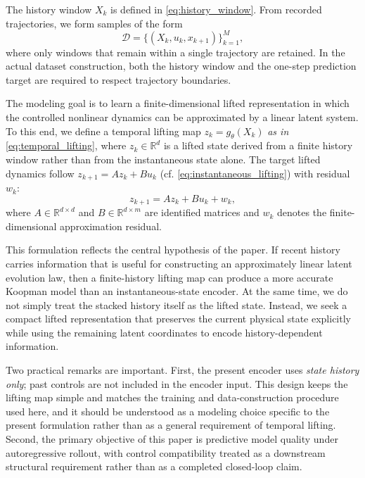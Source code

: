\documentclass[journal]{IEEEtran}
\begin{document}
The history window $X_k$ is defined in \eqref{eq:history_window}. From recorded trajectories, we form samples of the form
\begin{equation}
    \mathcal{D} = \{(X_k,u_k,x_{k+1})\}_{k=1}^{M},
    \label{eq:dataset}
\end{equation}
where only windows that remain within a single trajectory are retained. In the actual dataset construction, both the history window and the one-step prediction target are required to respect trajectory boundaries.

The modeling goal is to learn a finite-dimensional lifted representation in which the controlled nonlinear dynamics can be approximated by a linear latent system. To this end, we define a temporal lifting map $z_k = g_\theta(X_k)$ \emph{as in} \eqref{eq:temporal_lifting}, where $z_k \in \mathbb{R}^d$ is a lifted state derived from a finite history window rather than from the instantaneous state alone. The target lifted dynamics follow $z_{k+1}=Az_k+Bu_k$ (cf. \eqref{eq:instantaneous_lifting}) with residual $w_k$:
\begin{equation}
    z_{k+1} = A z_k + B u_k + w_k,
    \label{eq:lifted_dynamics}
\end{equation}
where $A \in \mathbb{R}^{d\times d}$ and $B \in \mathbb{R}^{d\times m}$ are identified matrices and $w_k$ denotes the finite-dimensional approximation residual.

This formulation reflects the central hypothesis of the paper. If recent history carries information that is useful for constructing an approximately linear latent evolution law, then a finite-history lifting map can produce a more accurate Koopman model than an instantaneous-state encoder. At the same time, we do not simply treat the stacked history itself as the lifted state. Instead, we seek a compact lifted representation that preserves the current physical state explicitly while using the remaining latent coordinates to encode history-dependent information.

Two practical remarks are important. First, the present encoder uses \emph{state history only}; past controls are not included in the encoder input. This design keeps the lifting map simple and matches the training and data-construction procedure used here, and it should be understood as a modeling choice specific to the present formulation rather than as a general requirement of temporal lifting. Second, the primary objective of this paper is predictive model quality under autoregressive rollout, with control compatibility treated as a downstream structural requirement rather than as a completed closed-loop claim.
\end{document}
